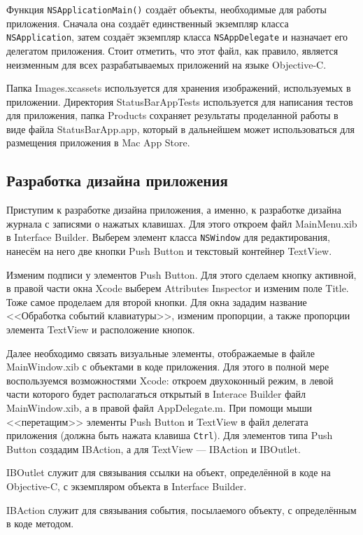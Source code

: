 Функция \texttt{NSApplicationMain()} создаёт объекты, необходимые для работы приложения.
Сначала она создаёт единственный экземпляр класса \texttt{NSApplication}, затем создаёт
экземпляр класса \texttt{NSAppDelegate} и назначает его делегатом приложения.
Стоит отметить, что этот файл, как правило, является неизменным для всех
разрабатываемых приложений на языке Objective-C.

Папка Images.xcassets используется для хранения изображений, используемых
в приложении. Директория StatusBarAppTests используется для написания тестов
для приложения, папка Products сохраняет результаты проделанной работы в виде
файла StatusBarApp.app, который в дальнейшем может использоваться для
размещения приложения в Mac App Store.


\subsection{Разработка дизайна приложения}

Приступим к разработке дизайна приложения, а именно, к разработке дизайна журнала
с записями о нажатых клавишах. Для этого откроем файл MainMenu.xib
в Interface Builder. Выберем элемент класса \texttt{NSWindow} для редактирования,
нанесём на него две кнопки Push Button и текстовый контейнер TextView.

Изменим подписи у элементов Push Button. Для этого сделаем кнопку
активной, в правой части окна Xcode выберем Attributes Inspector и изменим
поле Title. Тоже самое проделаем для второй кнопки. Для окна зададим название
<<Обработка событий клавиатуры>>, изменим пропорции, а также пропорции
элемента TextView и расположение кнопок.

Далее необходимо связать визуальные элементы, отображаемые в файле MainWindow.xib
с объектами в коде приложения. Для этого в полной мере воспользуемся возможностями
Xcode: откроем двухоконный режим, в левой части которого будет располагаться
открытый в Interace Builder файл MainWindow.xib, а в правой файл AppDelegate.m.
При помощи мыши <<перетащим>> элементы Push Button и TextView в файл делегата
приложения (должна быть нажата клавиша \texttt{Ctrl}). Для элементов типа Push Button
создадим IBAction, а для TextView --- IBAction и IBOutlet.

IBOutlet служит для связывания ссылки на объект, определённой в коде на Objective-C,
с экземпляром объекта в Interface Builder.

IBAction служит для связывания события, посылаемого объекту, с определённым
в коде методом.

